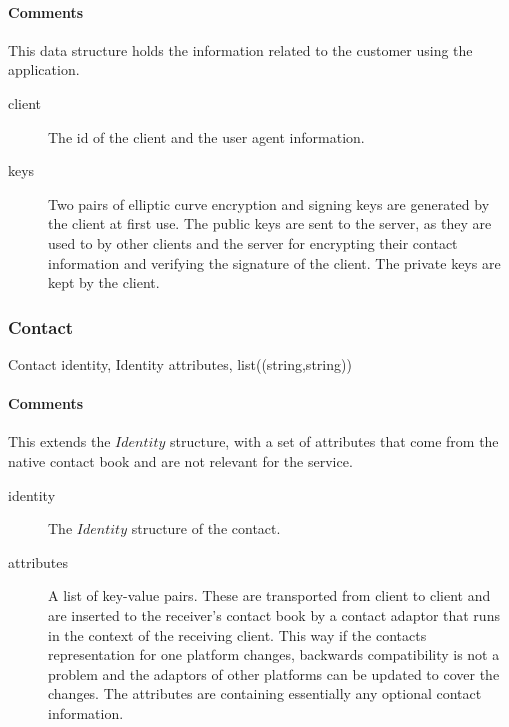 \documentclass[a4paper,10pt]{article}
\begin{document}
\begin{inparaitem}[ ]
 \item \unique
 \item \secure
 \item \persistent
\end{inparaitem}

\paragraph*{Comments}
This data structure holds the information related to the customer using the application.

\SpecialItem
\begin{description}
 \item[client] The id of the client and the user agent information.
 \item[keys] Two pairs of elliptic curve encryption and signing keys are generated by the client at first use. The public keys are sent to the server, as they are used to by other 
clients and the server for encrypting their contact information and verifying the signature of the client. The private keys are kept by the client.
\end{description}

\subsubsection{Contact}
\label{sec:structure:client:contact}

\begin{verbbox}
Contact
{
  identity, Identity
  attributes, list((string,string))
}
\end{verbbox}
\begin{center}
\theverbbox
\end{center}

\begin{inparaitem}[ ]
 \item \infrastructure
\end{inparaitem}

\paragraph*{Comments}
This extends the $Identity$ structure, with a set of attributes that come from the native contact book and are not relevant for the service.

\SpecialItem
\begin{description}
 \item[identity] The $Identity$ structure of the contact.
 \item[attributes] A list of key-value pairs. These are transported from client to client and are inserted to the receiver's contact book by a contact adaptor that runs in the 
context of the receiving client. This way if the contacts representation for one platform changes, backwards compatibility is not a problem and the adaptors of other platforms can 
be updated to cover the changes. The attributes are containing essentially any optional contact information.
\end{description}
\end{document}
